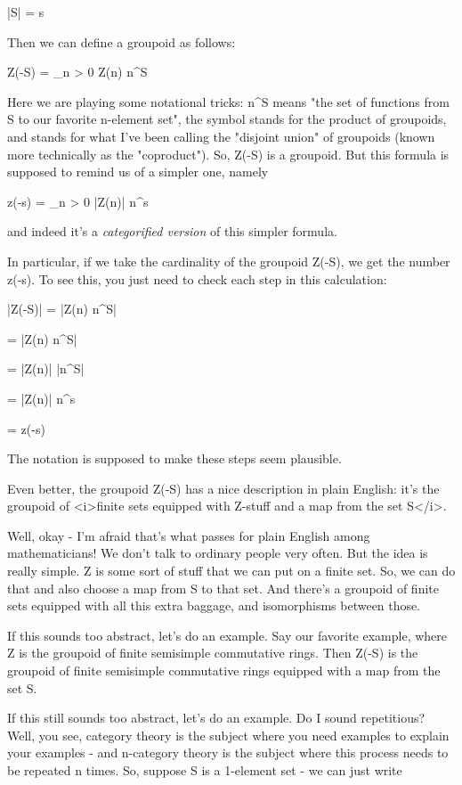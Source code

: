 |S| = s

Then we can define a groupoid as follows:

Z(-S) = \sum_{n > 0} Z(n) \times  n^{S}

Here we are playing some notational tricks: n^{S} means "the
set of functions from S to our favorite n-element set", the symbol
\times  stands for the product of groupoids, and \sum stands for what
I've been calling the "disjoint union" of groupoids (known more
technically as the "coproduct").  So, Z(-S) is a groupoid.  But this
formula is supposed to remind us of a simpler one, namely

z(-s) = \sum_{n > 0} |Z(n)| n^{s}

and indeed it's a \emph{categorified version} of this simpler formula.  

In particular, if we take the cardinality of the groupoid Z(-S), we
get the number z(-s).  To see this, you just need to check each step
in this calculation:

|Z(-S)| = |\sum Z(n) \times  n^{S}|

= \sum |Z(n) \times  n^{S}|

= \sum |Z(n)| \times  |n^{S}|

= \sum |Z(n)| \times  n^{s}

= z(-s)

The notation is supposed to make these steps seem plausible.  

Even better, the groupoid Z(-S) has a nice description in plain
English: it's the groupoid of <i>finite sets equipped with Z-stuff and
a map from the set S</i>.

Well, okay - I'm afraid that's what passes for plain English among
mathematicians!  We don't talk to ordinary people very often.  But the
idea is really simple.  Z is some sort of stuff that we can put on a
finite set.  So, we can do that and also choose a map from S to that
set.  And there's a groupoid of finite sets equipped with all this
extra baggage, and isomorphisms between those.

If this sounds too abstract, let's do an example.  Say our favorite example, where Z is the groupoid of finite semisimple commutative rings.  Then Z(-S) is the groupoid of finite semisimple commutative rings equipped with a map from the set S.

If this still sounds too abstract, let's do an example.  Do I sound
repetitious?  Well, you see, category theory is the subject where you
need examples to explain your examples - and n-category theory is the
subject where this process needs to be repeated n times.  So,
suppose S is a 1-element set - we can just write

